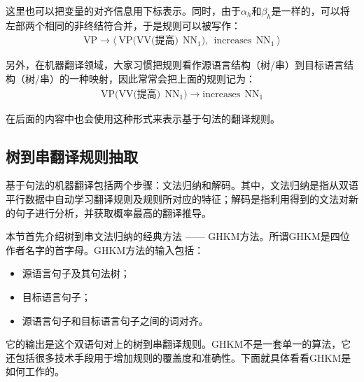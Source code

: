 \parinterval 这里也可以把变量的对齐信息用下标表示。同时，由于$\alpha_h$和$\beta_h$是一样的，可以将左部两个相同的非终结符合并，于是规则可以被写作：
\begin{eqnarray}
\textrm{VP} \rightarrow \langle\ \textrm{VP(VV(提高)}\ \ \textrm{NN}_1),\ \ \textrm{increases}\ \ \textrm{NN}_1\ \rangle \nonumber
\end{eqnarray}

\parinterval 另外，在机器翻译领域，大家习惯把规则看作源语言结构（树/串）到目标语言结构（树/串）的一种映射，因此常常会把上面的规则记为：
\begin{eqnarray}
\textrm{VP(VV(提高)}\ \ \textrm{NN}_1) \rightarrow \textrm{increases}\ \ \textrm{NN}_1 \nonumber
\end{eqnarray}

\parinterval 在后面的内容中也会使用这种形式来表示基于句法的翻译规则。


\subsection{树到串翻译规则抽取}

\parinterval 基于句法的机器翻译包括两个步骤：文法归纳和解码。其中，文法归纳是指从双语平行数据中自动学习翻译规则及规则所对应的特征；解码是指利用得到的文法对新的句子进行分析，并获取概率最高的翻译推导。

\parinterval 本节首先介绍树到串文法归纳的经典方法 —— GHKM方法。所谓GHKM是四位作者名字的首字母。GHKM方法的输入包括：

\begin{itemize}
\vspace{0.5em}
\item 源语言句子及其句法树；
\vspace{0.5em}
\item 目标语言句子；
\vspace{0.5em}
\item 源语言句子和目标语言句子之间的词对齐。
\vspace{0.5em}
\end{itemize}

\parinterval 它的输出是这个双语句对上的树到串翻译规则。GHKM不是一套单一的算法，它还包括很多技术手段用于增加规则的覆盖度和准确性。下面就具体看看GHKM是如何工作的。

